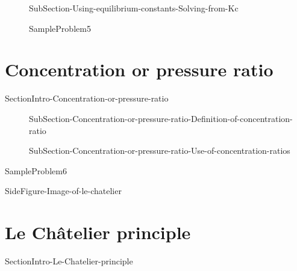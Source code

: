 \documentclass[main.tex]{subfiles}
\begin{document}
   
   \sloppy
\begin{description}
\item[]{SubSection-Using-equilibrium-constants-Solving-from-Kc}



  {SampleProblem5}
\end{description}
 



\section{ Concentration or pressure ratio}
   {SectionIntro-Concentration-or-pressure-ratio}
\sloppy\begin{description}

\item[] {SubSection-Concentration-or-pressure-ratio-Definition-of-concentration-ratio}



\item[] {SubSection-Concentration-or-pressure-ratio-Use-of-concentration-ratios}


\end{description}
  {SampleProblem6}










{SideFigure-Image-of-le-chatelier}

\section{ {Le Ch\^{a}telier principle}}
   {SectionIntro-Le-Chatelier-principle}
\end{document}
